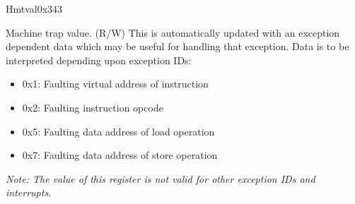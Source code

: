 \begin{register}{H}{mtval}{0x343}\label{regdesc:MTVAL}
%
\regnewline%
\begin{regdesc}\begin{reglist}
\label{fielddesc:MTVAL}\item [MTVAL] Machine trap value. (R/W) \newline This is automatically updated with an exception dependent data which may be useful for handling that exception.
\newline Data is to be interpreted depending upon exception IDs:
\begin{itemize}
    \setlength\itemsep{-1em}
    \item 0x1: Faulting virtual address of instruction
    \item 0x2: Faulting instruction opcode
    \item 0x5: Faulting data address of load operation
    \item 0x7: Faulting data address of store operation
\end{itemize}
\textit {Note: The value of this register is not valid for  other exception IDs and interrupts.}
\end{reglist}\end{regdesc}
\end{register}

